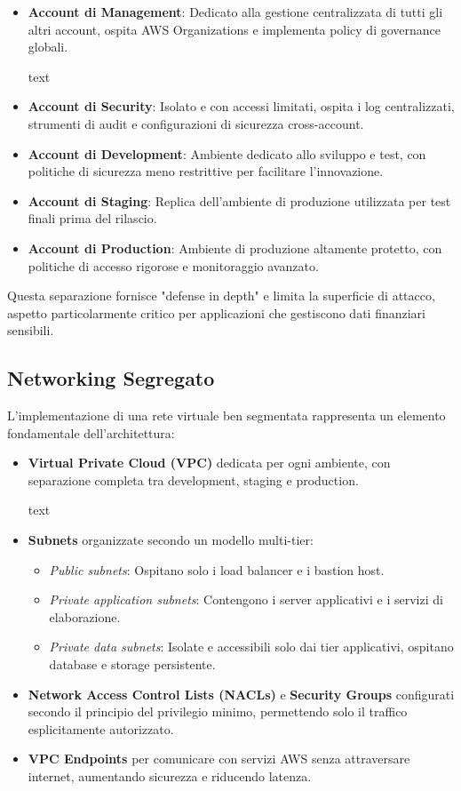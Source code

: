 \documentclass[a4paper,12pt]{report}
\begin{document}
\begin{itemize}
\item \textbf{Account di Management}: Dedicato alla gestione centralizzata di tutti gli altri account, ospita AWS Organizations e implementa policy di governance globali.

text
\item \textbf{Account di Security}: Isolato e con accessi limitati, ospita i log centralizzati, strumenti di audit e configurazioni di sicurezza cross-account.

\item \textbf{Account di Development}: Ambiente dedicato allo sviluppo e test, con politiche di sicurezza meno restrittive per facilitare l'innovazione.

\item \textbf{Account di Staging}: Replica dell'ambiente di produzione utilizzata per test finali prima del rilascio.

\item \textbf{Account di Production}: Ambiente di produzione altamente protetto, con politiche di accesso rigorose e monitoraggio avanzato.
\end{itemize}

Questa separazione fornisce "defense in depth" e limita la superficie di attacco, aspetto particolarmente critico per applicazioni che gestiscono dati finanziari sensibili.

\subsection{Networking Segregato}

L'implementazione di una rete virtuale ben segmentata rappresenta un elemento fondamentale dell'architettura:

\begin{itemize}
\item \textbf{Virtual Private Cloud (VPC)} dedicata per ogni ambiente, con separazione completa tra development, staging e production.

text
\item \textbf{Subnets} organizzate secondo un modello multi-tier:
\begin{itemize}
    \item \textit{Public subnets}: Ospitano solo i load balancer e i bastion host.
    \item \textit{Private application subnets}: Contengono i server applicativi e i servizi di elaborazione.
    \item \textit{Private data subnets}: Isolate e accessibili solo dai tier applicativi, ospitano database e storage persistente.
\end{itemize}

\item \textbf{Network Access Control Lists (NACLs)} e \textbf{Security Groups} configurati secondo il principio del privilegio minimo, permettendo solo il traffico esplicitamente autorizzato.

\item \textbf{VPC Endpoints} per comunicare con servizi AWS senza attraversare internet, aumentando sicurezza e riducendo latenza.
\end{itemize}
\end{document}
